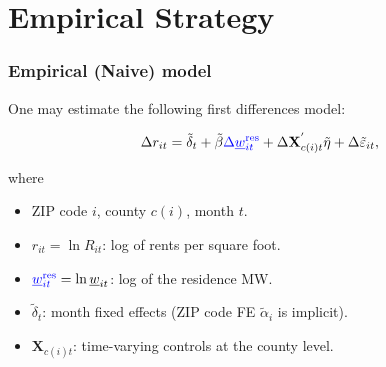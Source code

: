 \documentclass[aspectratio=169, t]{beamer}
\newcommand{\MW}{\underline{w}}
\begin{document}
\section{Empirical Strategy}

\begin{frame}[label = stat_only_model]
    \frametitle{Empirical (Naive) model}
    
    One may estimate the following first differences model:
    
    $$
    \Delta r_{it} = \tilde\delta_t + 
    \tilde\beta {\color{blue} \Delta \MW^{\text{res}}_{it}} + 
    \Delta \mathbf{X}^{'}_{c(i)t} \tilde\eta + 
    \Delta \tilde\varepsilon_{it} ,
    $$
    
    where    
    \begin{itemize} \small
    \item ZIP code $i$, county $c(i)$, month $t$.
    
    \item \vspace{1mm} $r_{it} = \ln R_{it}$: log of rents per square foot.
    
    \item \vspace{1mm} ${\color{blue} \MW^{\text{res}}_{it}} = \ln \MW_{it}$: log of the residence MW.
    
    \item \vspace{1mm} $\tilde\delta_t$: month fixed effects (ZIP code FE $\tilde\alpha_i 
    $ is 
    implicit).
    
    \item \vspace{.5mm} $\mathbf{X}_{c(i)t}$: time-varying controls at the county level.
    \end{itemize}
\end{frame}
\end{document}
